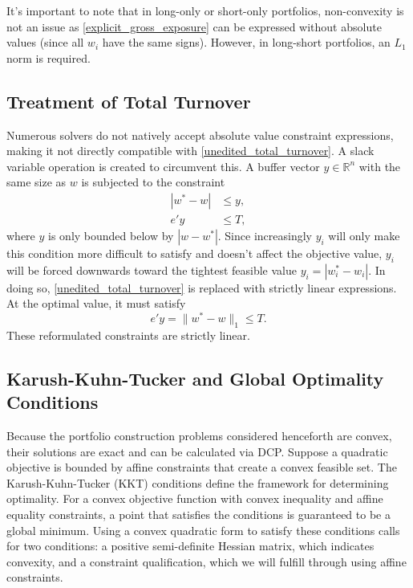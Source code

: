 \documentclass[11pt, letterpaper]{article}
\begin{document}
It's important to note that in long-only or short-only portfolios, non-convexity is not an issue as \eqref{explicit_gross_exposure}
can be expressed without absolute values (since all $w_i$ have the same signs). However, in long-short portfolios, an
$L_1$ norm is required.
\subsection{Treatment of Total Turnover}
\label{total_turnover_section}
Numerous solvers do not natively accept absolute value constraint expressions, making it not directly compatible with
\eqref{unedited_total_turnover}. A slack variable operation is created to circumvent this. A buffer vector $y \in \mathds{R}^n$
with the same size as $w$ is subjected to the constraint
\begin{align*}
	|w^* - w| &\leq y, \\ e'y &\le T,
\end{align*}
where $y$ is only bounded below by $|w - w^*|$.
Since increasingly $y_i$ will only make this condition more difficult to satisfy and doesn't affect the objective value,
$y_i$ will be forced downwards toward the tightest feasible value $y_i = |w_i^* - w_i|$. In doing so, \eqref{unedited_total_turnover}
is replaced with strictly linear expressions. At the optimal value, it must satisfy
\begin{equation*}
    e' y = \lVert w^* - w\rVert_1 \leq T.
\end{equation*}
These reformulated constraints are strictly linear.

\subsection{Karush-Kuhn-Tucker and Global Optimality Conditions}
\label{KKT_section}
Because the portfolio construction problems considered henceforth are convex, their solutions are
exact and can be calculated via DCP. Suppose a quadratic objective is bounded by affine constraints that
create a convex feasible set. The Karush-Kuhn-Tucker (KKT) conditions \cite{boyd2004KKT} define the framework for determining
optimality. For a convex objective function with convex inequality and affine equality constraints, a point
that satisfies the conditions is guaranteed to be a global minimum. Using a convex quadratic form to satisfy these conditions
calls for two conditions: a positive semi-definite Hessian matrix, which indicates convexity, and a
constraint qualification, which we will fulfill through using affine constraints.
\end{document}
